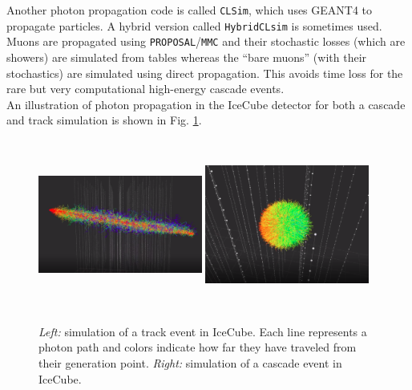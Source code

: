 \noindent Another photon propagation code is called \texttt{CLSim}, which uses GEANT4 to propagate particles. A hybrid version called \texttt{HybridCLsim} is sometimes used. Muons are propagated using \texttt{PROPOSAL}/\texttt{MMC}  and their stochastic losses (which are showers) are simulated from tables whereas the ``bare muons'' (with their stochastics) are simulated using direct propagation. This avoids time loss for the rare but very computational high-energy cascade events.\\

\noindent An illustration of photon propagation in the IceCube detector for both a cascade and track simulation is shown in Fig. \ref{fig:photonsimulation}.

\begin{figure}
\centering
\includegraphics[width=0.48\textwidth,height=2.2in]{chapter6/img/photons_track.png}
\includegraphics[width=0.48\textwidth,height=2.2in]{chapter6/img/photons_cascade.png}
\caption{\textit{Left:} simulation of a track event in IceCube. Each line represents a photon path and colors indicate how far they have traveled from their generation point. \textit{Right:} simulation of a cascade event in IceCube.}
\label{fig:photonsimulation}
\end{figure}


